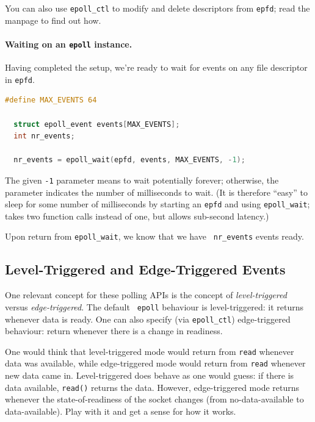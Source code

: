 \documentclass[a4paper]{report}
\begin{document}
You can also use {\tt epoll\_ctl} to modify and delete descriptors from {\tt epfd}; read the manpage to find out how.

\paragraph{Waiting on an {\tt epoll} instance.} Having completed
the setup, we're ready to wait for events on any file descriptor in {\tt epfd}.
    \begin{lstlisting}[language=C]
  #define MAX_EVENTS 64

  struct epoll_event events[MAX_EVENTS];
  int nr_events;

  nr_events = epoll_wait(epfd, events, MAX_EVENTS, -1);
    \end{lstlisting}

The given {\tt -1} parameter means to wait potentially forever;
otherwise, the parameter indicates the number of milliseconds to wait.
(It is therefore ``easy'' to sleep for some number of milliseconds by
starting an {\tt epfd} and using {\tt epoll\_wait}; takes two function
calls instead of one, but allows sub-second latency.)

Upon return from {\tt epoll\_wait}, we know that we have {\tt
  nr\_events} events ready.

\subsection*{Level-Triggered and Edge-Triggered Events}
One relevant concept for these polling APIs is the concept of
\emph{level-triggered} versus \emph{edge-triggered}.  The default {\tt
  epoll} behaviour is level-triggered: it returns whenever data is
ready. One can also specify (via {\tt epoll\_ctl}) edge-triggered
behaviour: return whenever there is a change in readiness.


One would think that level-triggered mode would return from {\tt read}
whenever data was available, while edge-triggered mode would return
from {\tt read} whenever new data came in. Level-triggered does behave
as one would guess: if there is data available, {\tt read()} returns
the data. However, edge-triggered mode returns whenever the
state-of-readiness of the socket changes (from no-data-available to
data-available). Play with it and get a sense for how it works.
\end{document}
